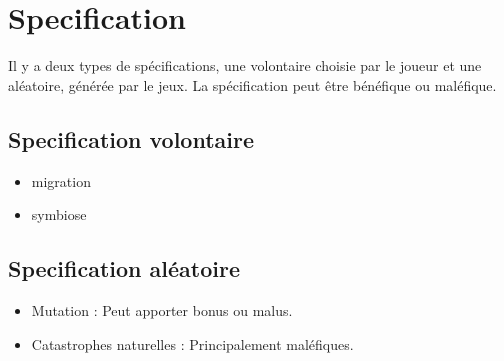 \section{Specification}
Il y a deux types de spécifications, une volontaire choisie par le joueur et une aléatoire, générée par le jeux. La spécification peut être bénéfique ou maléfique.
\subsection{Specification volontaire}
\begin{itemize}
	\item migration
	\item symbiose
\end{itemize}
\subsection{Specification aléatoire}
\begin{itemize}
	\item Mutation : Peut apporter bonus ou malus.
	\item Catastrophes naturelles : Principalement maléfiques.
\end{itemize}